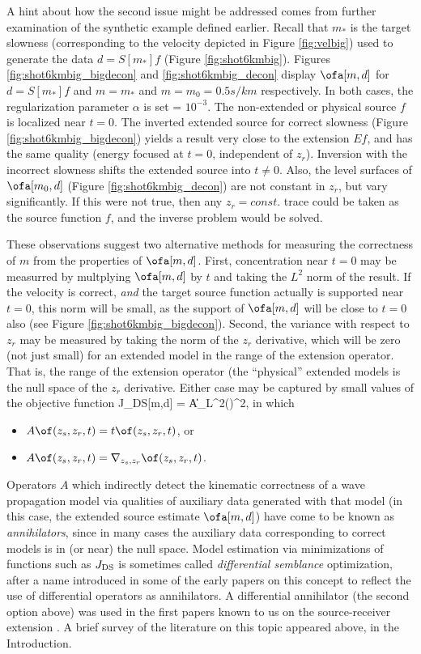 A hint about how the second issue might be addressed comes from
further examination of the synthetic example defined earlier. Recall
that $m_*$ is the target slowness 
(corresponding to the velocity depicted in Figure \ref{fig:velbig})
used to generate the data $d=S[m_*]f$ (Figure \ref{fig:shot6kmbig}).
Figures \ref{fig:shot6kmbig_bigdecon} and \ref{fig:shot6kmbig_decon} display
$\ofa[m,d]$ for $d=S[m_*]f$ and $m=m_*$ and $m=m_0 = 0.5 s/km$
respectively. In both cases, the regularization parameter $\alpha$ is
set = $10^{-3}$. The non-extended or
physical source $f$ is localized near $t=0$. The inverted extended
source for correct slowness (Figure \ref{fig:shot6kmbig_bigdecon})
yields a result very close to the extension $Ef$, and has the same
quality (energy focused at $t=0$, independent of $z_r$). Inversion with the incorrect slowness
shifts the extended source into $t \ne 0$. Also, the level surfaces of
$\ofa[m_0,d]$ (Figure \ref{fig:shot6kmbig_decon}) are not
constant in $z_r$, but vary significantly. If this were not true, then
any $z_r=const.$ trace could be taken as the source function $f$, and
the inverse problem would be solved. 

These observations suggest two alternative methods for measuring the
correctness of $m$ from the properties of $\ofa[m,d]$. First,
concentration near $t=0$ may be measurred by multplying $\ofa[m,d]$ by $t$ and taking the $L^2$ norm of the result. If the velocity
is correct, {\em and} the target source function actually is supported
near $t=0$, this norm will be small, as the support of $\ofa[m,d]$
will be close to $t=0$ also (see Figure \ref{fig:shot6kmbig_bigdecon}). Second, the variance with respect to $z_r$ may
be measured by taking the norm of the $z_r$ derivative, which will be
zero (not just small) for an extended model in the range of the
extension operator. That is, the range of the extension operator (the
``physical'' extended models is the null space of the $z_r$ derivative.
Either case may be captured by small values of the objective function
\be\label{eqn:dsdef}
J_{\rm DS}[m,d] = \|A\ofa[m,d]\|_{L^2(\Omega)}^2,
\ee
in which
\begin{itemize}
\item $A\of(z_s,z_r,t) = t\of(z_s,z_r,t)$, or
\item $A\of(z_s,z_r,t) = \nabla_{z_s,z_r}\of(z_s,z_r,t)$.
\end{itemize}
Operators $A$ which indirectly detect the kinematic correctness of a
wave propagation model via qualities of auxiliary data generated with
that model (in this case, the extended source estimate $\ofa[m,d]$)
have come to be known as {\em annihilators}, since in many cases the
auxiliary data corresponding to correct models is in (or near) the
null space. Model estimation via minimizations of functions such as
$J_{\rm DS}$ is sometimes called {\em differential semblance}
optimization, after a name introduced in some of the early papers on
this concept \cite[]{SymesCar:91,KerSy:94} to reflect the use of
differential operators as annihilators. A differential annihilator
(the second option above) was used in the first papers known to us on the
source-receiver extension \cite[]{SongSymes:94b,Symes:94c}. A brief
survey of the literature on this topic appeared above, in the
Introduction.

